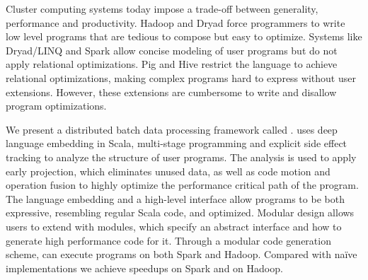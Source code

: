 Cluster computing systems today impose a trade-off between generality,
performance and productivity. Hadoop and Dryad force programmers to write low
level programs that are tedious to compose but easy to optimize. Systems like
Dryad/LINQ and Spark allow concise modeling of user programs but do not apply
relational optimizations. Pig and Hive restrict the language to achieve
relational optimizations, making complex programs hard to express without user
extensions. However, these extensions are cumbersome to write and disallow
program optimizations.

We present a distributed batch data processing framework called \tool.
\tool uses deep language embedding in Scala, multi-stage programming and explicit side effect
tracking to analyze the structure of user programs. The analysis is used to
apply early projection, which eliminates unused data, as well as code
motion and operation fusion to highly optimize the performance critical path of
the program. The language embedding and a high-level interface allow \tool
programs to be both expressive, resembling regular Scala code, and optimized.
Modular design allows users to extend \tool with modules, which specify an
abstract interface and how to generate high performance code for it. Through a
modular code generation scheme, \tool can execute programs on both Spark and
Hadoop. Compared with naïve implementations we achieve  speedups on
Spark and  on Hadoop.
